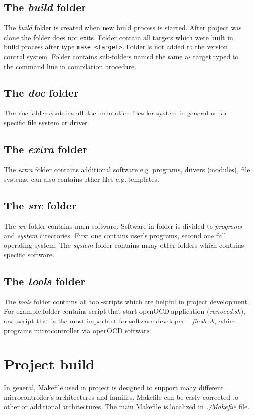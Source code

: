 \documentclass[a4paper,11pt]{report}
\renewcommand{\path}[1]{\textit{#1}}
\newcommand{\cmd}[1]{\texttt{#1}}
\begin{document}
\section{The \path{build} folder}
The \path{build} folder is created when new build process is started. After project was clone
the folder does not exits. Folder contain all targets which were built in build process after type
\cmd{make <target>}. Folder is not added to the version control system. Folder contains sub-folders
named the same as target typed to the command line in compilation procedure.

\section{The \path{doc} folder}
The \path{doc} folder contains all documentation files for system in general or for specific file
system or driver.

\section{The \path{extra} folder}
The \path{extra} folder contains additional software e.g. programs, drivers (modules), file
systems; can also contains other files e.g. templates.

\section{The \path{src} folder}
The \path{src} folder contains main software. Software in folder is divided to \path{programs}
and \path{system} directories. First one contains user's programs, second one full operating system.
The \path{system} folder contains many other folders which contains specific software.

\section{The \path{tools} folder}
The \path{tools} folder contains all tool-scripts which are helpful in project development. For
example folder contains script that start openOCD application (\path{runoocd.sh}), and script
that is the most important for software developer -- \path{flash.sh}, which programs microcontroller
via openOCD software.


\chapter{Project build}
In general, Makefile used in project is designed to support many different microcontroller's
architectures and families. Makefile can be easly corrected to other or additional architectures.
The main Makefile is localized in \path{./Makefile} file.
\end{document}
